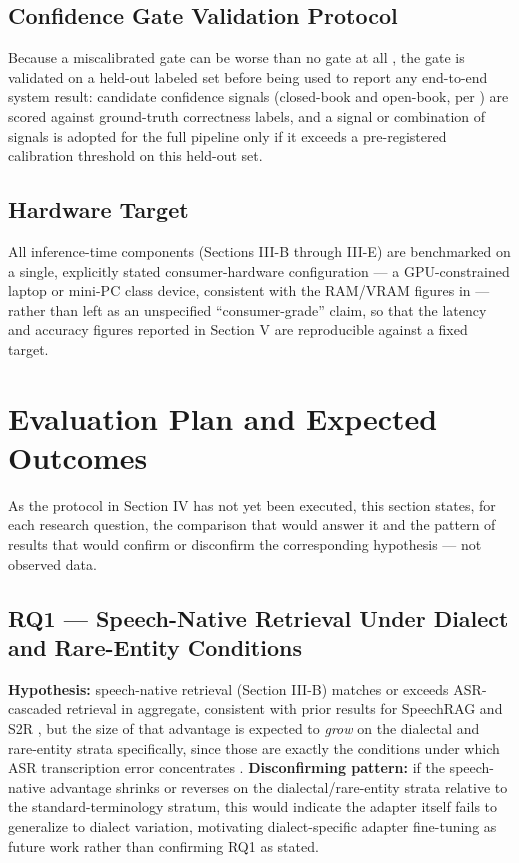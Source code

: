 \documentclass[conference]{IEEEtran}
\begin{document}
\subsection{Confidence Gate Validation Protocol}
Because a miscalibrated gate can be worse than no gate at all \cite{intrygue2026}, the gate is validated on a held-out labeled set before being used to report any end-to-end system result: candidate confidence signals (closed-book and open-book, per \cite{dependablerag2026}) are scored against ground-truth correctness labels, and a signal or combination of signals is adopted for the full pipeline only if it exceeds a pre-registered calibration threshold on this held-out set.

\subsection{Hardware Target}
All inference-time components (Sections III-B through III-E) are benchmarked on a single, explicitly stated consumer-hardware configuration --- a GPU-constrained laptop or mini-PC class device, consistent with the RAM/VRAM figures in \cite{compactllm2026} --- rather than left as an unspecified ``consumer-grade'' claim, so that the latency and accuracy figures reported in Section V are reproducible against a fixed target.

\section{Evaluation Plan and Expected Outcomes}

As the protocol in Section IV has not yet been executed, this section states, for each research question, the comparison that would answer it and the pattern of results that would confirm or disconfirm the corresponding hypothesis --- not observed data.

\subsection{RQ1 --- Speech-Native Retrieval Under Dialect and Rare-Entity Conditions}
\textbf{Hypothesis:} speech-native retrieval (Section III-B) matches or exceeds ASR-cascaded retrieval in aggregate, consistent with prior results for SpeechRAG and S2R \cite{min2025speechrag,google2025s2r}, but the size of that advantage is expected to \emph{grow} on the dialectal and rare-entity strata specifically, since those are exactly the conditions under which ASR transcription error concentrates \cite{benchmarkingasr2026,dialectmatters2026}. \textbf{Disconfirming pattern:} if the speech-native advantage shrinks or reverses on the dialectal/rare-entity strata relative to the standard-terminology stratum, this would indicate the adapter itself fails to generalize to dialect variation, motivating dialect-specific adapter fine-tuning as future work rather than confirming RQ1 as stated.
\end{document}

